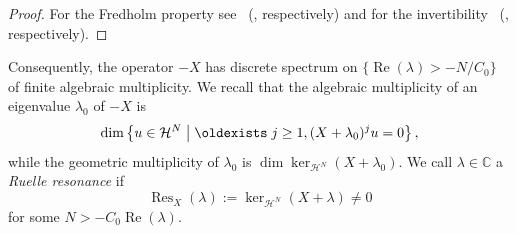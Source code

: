 \documentclass[AHL, Unicode, longabstracts, published]{cedram}
\DeclareMathOperator{\Res}{Res}
\DeclareMathOperator{\Real}{Re}
\newcommand{\mc}{\mathcal}
\newcommand{\cc}{\mathbb{C}}
\newcommand{\la}{\lambda}
\let\Re=\Real
\renewcommand{\Re}{\operatorname{Re}}
\renewcommand*{\exists}{\mathrel{\oldexists}}
\begin{document}
\begin{proof}
For the Fredholm property see~\cite[Theorem~1.4]{FSj11} (\cite[Proposition~3.2]{DZ16}, respectively) and for the invertibility~\cite[Lemma~3.3]{FSj11} (\cite[Proposition~3.1]{DZ16}, respectively).
\end{proof}

Consequently, the operator $-X$ has discrete spectrum on $\{\Re(\lambda)>-N/C_0\}$ of finite algebraic multiplicity. We recall that the algebraic multiplicity of an eigenvalue $\la_0$ of $-X$ is
\[
\dim \left\{u\in \mc{H}^N\;\middle|\; \exists j\geq 1, (X+\la_0)^ju=0\right\},
\]
while the geometric multiplicity of $\la_0$ is $\dim \ker_{\mc{H}^N}(X+\la_0)$. We call $\lambda \in \cc$ a \emph{Ruelle resonance} if
\[
\Res_{X}(\lambda) := \ker_{\mc{H}^N}(X+\lambda) \neq 0
\]
for some $N> -C_0\Re(\lambda)$.
\end{document}
